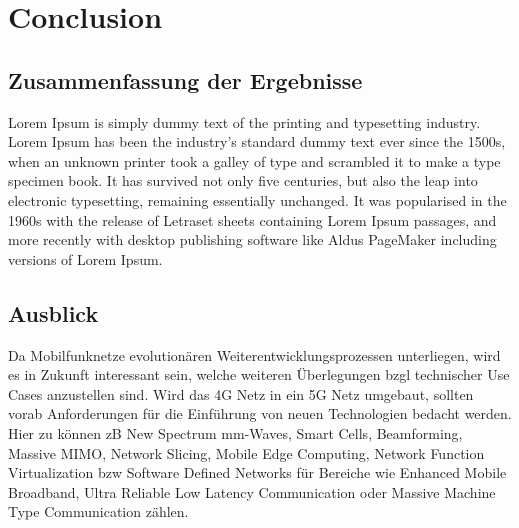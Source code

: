 
%
%
% 
% 
% 

\section{Conclusion}
\label{sec:conclusion}
\subsection{Zusammenfassung der Ergebnisse}
\label{subsec:zusammenfassung}
Lorem Ipsum is simply dummy text of the printing and typesetting industry. Lorem Ipsum has been the industry's standard dummy text ever since the 1500s, when an unknown printer took a galley of type and scrambled it to make a type specimen book. It has survived not only five centuries, but also the leap into electronic typesetting, remaining essentially unchanged. It was popularised in the 1960s with the release of Letraset sheets containing Lorem Ipsum passages, and more recently with desktop publishing software like Aldus PageMaker including versions of Lorem Ipsum.
\subsection{Ausblick}
\label{subsec:ausblick}
Da Mobilfunknetze evolutionären Weiterentwicklungsprozessen unterliegen, wird es in Zukunft interessant sein, welche weiteren Überlegungen bzgl technischer Use Cases anzustellen sind. Wird das 4G Netz in ein 5G Netz umgebaut, sollten vorab Anforderungen für die Einführung von neuen Technologien bedacht werden. Hier zu können zB New Spectrum mm-Waves, Smart Cells, Beamforming, Massive MIMO, Network Slicing, Mobile Edge Computing, Network Function Virtualization bzw Software Defined Networks  für Bereiche wie Enhanced Mobile Broadband, Ultra Reliable Low Latency Communication oder Massive Machine Type Communication zählen\cite{Wol19}.